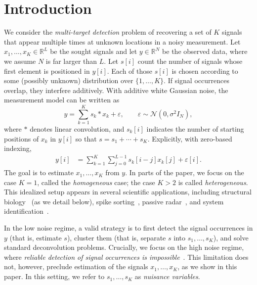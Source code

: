 \documentclass[12pt]{article}
\newcommand{\1}{\mathbf{1}}
\newcommand{\RL}{\mathbb{R}^L}
\newcommand{\RN}{\mathbb{R}^N}
\theoremstyle{plain}
\theoremstyle{definition}
\theoremstyle{remark}
\theoremstyle{plain}
\theoremstyle{remark}
\theoremstyle{plain}
\theoremstyle{plain}
\theoremstyle{plain}
\numberwithin{equation}{section}
\begin{document}
\section{Introduction} \label{sec:intro}

We consider the \emph{multi-target detection} problem of recovering a set of $K$ signals that appear 
multiple times at unknown locations in a noisy measurement.
Let ${x_1,\ldots,x_K\in\RL}$ be the sought signals and let $y\in\RN$ be the observed data, where we assume $N$ is  far larger than $L$. 
Let  $s[i]$ count the number of signals whose first element is positioned in $y[i]$. Each of those $s[i]$ is chosen according to some (possibly unknown) distribution over $\{1,\ldots,K\}$. 
If signal occurrences overlap, they interfere additively. %
With additive white Gaussian noise, the measurement model can be written as 
\begin{equation} 
	y  =  \sum_{k=1}^K s_k \ast x_k + \varepsilon, \qquad  \varepsilon   \sim \mathcal{N}(0,\sigma^2 I_N),
	\label{eq:model}
\end{equation}
where $\ast$ denotes linear convolution, and $s_k[i]$ indicates the number of starting positions of $x_k$ in $y[i]$ so that $s =  s_1+\cdots+s_K$. Explicitly, with zero-based indexing, %
\begin{align*}
	y[i] & = \sum_{k=1}^{K} \sum_{j = 0}^{L-1} s_k[i-j] x_k[j] + \varepsilon[i].
\end{align*}
The goal is  to estimate $x_1,\ldots,x_K$ from $y$. %
In parts of the paper, we focus on the case $K = 1$, called the \emph{homogeneous} case; the case $K > 2$ is called \emph{heterogeneous}.
This idealized setup appears in several scientific applications, including structural biology~\cite{bendory2018toward} (as we detail below), spike sorting~\cite{lewicki1998review}, passive radar~\cite{gogineni2017passive}, and system identification~\cite{ljung1998system}. 

In the low noise regime, a valid strategy is to first detect the signal occurrences in $y$ (that is, estimate $s$), cluster them (that is, separate $s$ into $s_1,\ldots,s_K$), and solve  standard deconvolution problems. Crucially, we focus on the high noise regime, where \emph{reliable detection of signal occurrences is  impossible}~\cite{bendory2018toward,aguerrebere2016fundamental}.
This limitation does not, however, preclude estimation of the signals $x_1,\ldots,x_K$, as we show in this paper. In this setting, we refer to  $s_1,\ldots,s_K$  as \emph{nuisance variables}.
\end{document}

